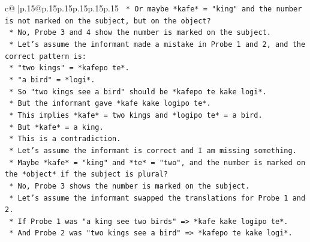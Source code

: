 \documentclass{article}
\begin{document}
{\begin{supertabular}{c@{$\;$}|p{.15\linewidth}@{}p{.15\linewidth}p{.15\linewidth}p{.15\linewidth}p{.15\linewidth}p{.15\linewidth}}
{{{\texttt{                                                        *   Or maybe *kafe* = "king" and the number is not marked on the subject, but on the object?} \\
\texttt{                                                        *   No, Probe 3 and 4 show the number is marked on the subject.} \\
\texttt{                                                        *   Let's assume the informant made a mistake in Probe 1 and 2, and the correct pattern is:} \\
\texttt{                                                            *   "two kings" = *kafepo te*.} \\
\texttt{                                                            *   "a bird" = *logi*.} \\
\texttt{                                                            *   So "two kings see a bird" should be *kafepo te kake logi*.} \\
\texttt{                                                            *   But the informant gave *kafe kake logipo te*.} \\
\texttt{                                                            *   This implies *kafe* = two kings and *logipo te* = a bird.} \\
\texttt{                                                            *   But *kafe* = a king.} \\
\texttt{                                                            *   This is a contradiction.} \\
\texttt{                                                            *   Let's assume the informant is correct and I am missing something.} \\
\texttt{                                                            *   Maybe *kafe* = "king" and *te* = "two", and the number is marked on the *object* if the subject is plural?} \\
\texttt{                                                            *   No, Probe 3 shows the number is marked on the subject.} \\
\texttt{                                                            *   Let's assume the informant swapped the translations for Probe 1 and 2.} \\
\texttt{                                                            *   If Probe 1 was "a king see two birds" => *kafe kake logipo te*.} \\
\texttt{                                                            *   And Probe 2 was "two kings see a bird" => *kafepo te kake logi*.} \\
}}}
\end{supertabular}}
\end{document}

